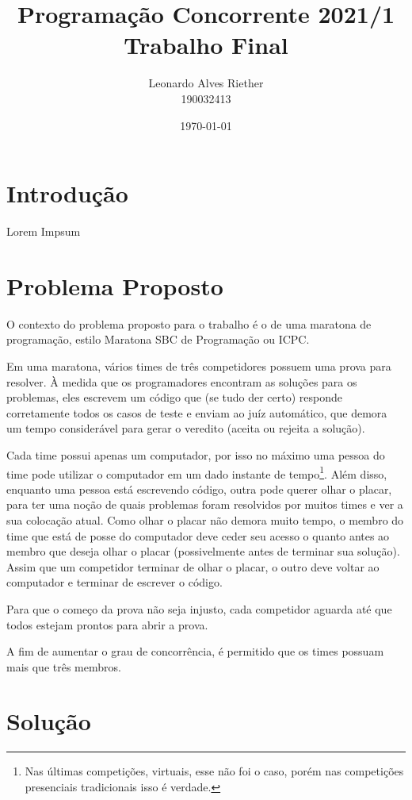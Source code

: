 \documentclass[11pt]{article}
\title{ Programação Concorrente 2021/1 \\
\Large{ Trabalho Final }}
\author{ Leonardo Alves Riether \\ 190032413 }
\date{\today}
\begin{document}
\maketitle
\pagebreak



\section{Introdução}

Lorem Impsum

\section{Problema Proposto}
O contexto do problema proposto para o trabalho é o de uma maratona de programação, estilo Maratona SBC
de Programação\cite{maratonasbc} ou ICPC\cite{icpc}.

Em uma maratona, vários times de três competidores possuem uma prova para resolver. À medida que os
programadores encontram as soluções para os problemas, eles escrevem um código que (se tudo der certo)
responde corretamente todos os casos de teste e enviam ao juíz automático, que demora um tempo
considerável para gerar o veredito (aceita ou rejeita a solução).

Cada time possui apenas um computador, por isso no máximo uma pessoa do time pode utilizar o computador
em um dado instante de tempo\footnote{Nas últimas competições, virtuais, esse não foi o caso, porém nas
competições presenciais tradicionais isso é verdade.}. Além disso, enquanto uma pessoa está escrevendo
código, outra pode querer olhar o placar, para ter uma noção de quais problemas foram resolvidos por
muitos times e ver a sua colocação atual. Como olhar o placar não demora muito tempo, o membro do time
que está de posse do computador deve ceder seu acesso o quanto antes ao membro que deseja olhar o placar
(possivelmente antes de terminar sua solução). Assim que um competidor terminar de olhar o placar, o
outro deve voltar ao computador e terminar de escrever o código.

Para que o começo da prova não seja injusto, cada competidor aguarda até que todos estejam prontos para
abrir a prova.

A fim de aumentar o grau de concorrência, é permitido que os times possuam mais que três membros.

\section{Solução}
\end{document}
